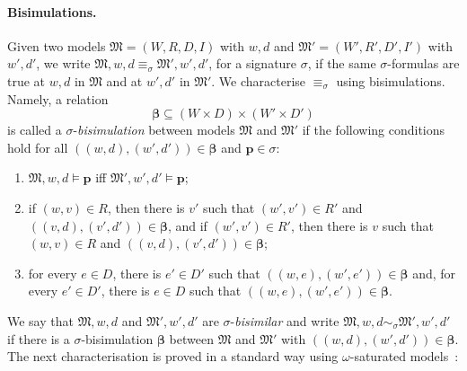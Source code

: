 \documentclass{lmcs} %
\theoremstyle{plain}\newtheorem{satz}[thm]{Satz} %
\newcommand{\nz}[1]{\textcolor{blue}{\bf!}%
	\marginpar[\parbox{15mm}{\raggedleft\scriptsize\textcolor{blue}{#1}}]%
	{\parbox{15mm}{\raggedright\scriptsize\textcolor{blue}{#1}}}}
\newcommand{\bs}{\boldsymbol{\beta}}
\newcommand{\fform}[1]{\boldsymbol{#1}}
\newcommand{\pvar}{\fform{p}}
\begin{document}
\paragraph{Bisimulations.}
Given two models $\mathfrak{M}= (W,R,D,I)$ with $w,d$ and $\mathfrak{M}'= (W',R',D',I')$ with $w',d'$,  we write \mbox{$\mathfrak{M},w,d  \equiv_{\sigma} \mathfrak{M}',w',d'$}, for a signature $\sigma$, if the same $\sigma$-formulas are true at $w,d$ in $\mathfrak M$ and at $w',d'$ in $\mathfrak M'$. 
%
%
We characterise $\equiv_{\sigma}$ using bisimulations. 
%
Namely, a relation 
%
$$
\bs \subseteq (W\times D) \times (W'\times D')
$$
%
is called a $\sigma$-\emph{bisimulation} between models $\mathfrak M$ and $\mathfrak M'$  if the following conditions hold for all $((w,d),(w',d'))\in \bs$ and $\pvar\in \sigma$:  
%
\begin{enumerate}[style=multiline,leftmargin=0.7cm]
\item[\textbf{(a)}] $\mathfrak M,w,d \models \pvar$ iff $\mathfrak M',w',d' \models \pvar$;
	
\item[\textbf{(w)}] if $(w,v)\in R$, then there is $v'$ such that $(w',v')\in R'$ and $((v,d),(v',d'))\in \bs$, and if $(w',v')\in R'$, then there is $v$ such that $(w,v)\in R$ and $((v,d),(v',d'))\in \bs$;
	
\item[\textbf{(d)}] for every $e\in D$, there is $e'\in D'$ such that $((w,e),(w',e'))\in \bs$ and, for every $e'\in D'$, there is $e\in D$ such that $((w,e),(w',e'))\in \bs$.
\end{enumerate}
%
We say that $\mathfrak{M},w,d$ and $\mathfrak{M}',w',d'$ are $\sigma$-\emph{bisimilar} and write 
%
$\mathfrak{M},w,d  \sim_{\sigma} \mathfrak{M}',w',d'$
%
if there is a $\sigma$-bisimulation $\bs$ between $\mathfrak{M}$ and $\mathfrak{M}'$ with $((w,d),(w',d')) \in \bs$. 
%
The next characterisation is proved in a standard way using $\omega$-saturated models~\cite{modeltheory,goranko20075}:
\end{document}
